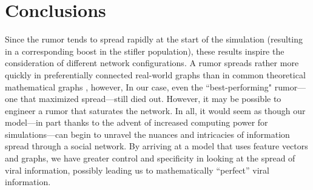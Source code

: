 \section{Conclusions}
\label{sec:conclusions}
Since the rumor tends to spread rapidly at the start of the simulation (resulting in a corresponding boost in the stifler population), these results inspire the consideration of different network configurations.  A rumor spreads rather more quickly in preferentially connected real-world graphs than in common theoretical mathematical graphs \cite{doerr-2012}, however, In our case, even the ``best-performing" rumor---one that maximized spread---still died out. However, it may be possible to engineer a rumor that saturates the network. 
In all, it would seem as though our model---in part thanks to the advent of increased computing power for simulations---can begin to unravel the nuances and intricacies of information spread through a social network. By arriving at a model that uses feature vectors and graphs, we have greater control and specificity in looking at the spread of viral information, possibly leading us to mathematically ``perfect'' viral information.